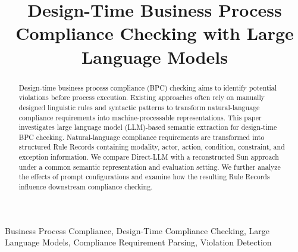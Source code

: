 \documentclass[conference]{IEEEtran}
\begin{document}
\title{Design-Time Business Process Compliance Checking with Large Language Models}

\author{
}

\maketitle



\begin{abstract}
Design-time business process compliance (BPC) checking aims to identify potential violations before process execution. Existing approaches often rely on manually designed linguistic rules and syntactic patterns to transform natural-language compliance requirements into machine-processable representations. This paper investigates large language model (LLM)-based semantic extraction for design-time BPC checking. Natural-language compliance requirements are transformed into structured Rule Records containing modality, actor, action, condition, constraint, and exception information. We compare Direct-LLM with a reconstructed Sun approach under a common semantic representation and evaluation setting. We further analyze the effects of prompt configurations and examine how the resulting Rule Records influence downstream compliance checking.
\end{abstract}

\begin{IEEEkeywords}
Business Process Compliance, Design-Time Compliance Checking,
Large Language Models, Compliance Requirement Parsing,
Violation Detection
\end{IEEEkeywords}


\end{document}
